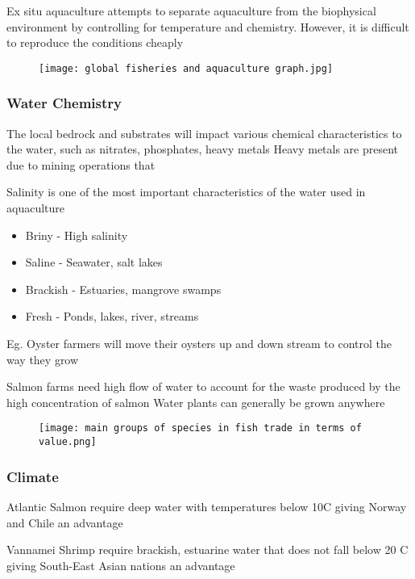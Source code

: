 		Ex situ aquaculture attempts to separate aquaculture from the biophysical environment by controlling for temperature and chemistry. However, it is difficult to reproduce the conditions cheaply

		\begin{figure}[H]
			\centering
			\texttt{[image: global fisheries and aquaculture graph.jpg]}
		\end{figure}

		\subsubsection{Water Chemistry}
			The local bedrock and substrates will impact various chemical characteristics to the water, such as nitrates, phosphates, heavy metals
			Heavy metals are present due to mining operations that 

			Salinity is one of the most important characteristics of the water used in aquaculture
			\begin{itemize}
				\item Briny - High salinity
				\item Saline - Seawater, salt lakes
				\item Brackish - Estuaries, mangrove swamps
				\item Fresh - Ponds, lakes, river, streams
			\end{itemize}
		
			Eg. Oyster farmers will move their oysters up and down stream to control the way they grow

			Salmon farms need high flow of water to account for the waste produced by the high concentration of salmon
			Water plants can generally be grown anywhere

			\begin{figure}[H]
				\centering
				\texttt{[image: main groups of species in fish trade in terms of value.png]}
			\end{figure}
			
		\subsubsection{Climate}
			Atlantic Salmon require deep water with temperatures below 10\textdegree C giving Norway and Chile an advantage

			Vannamei Shrimp require brackish, estuarine water that does not fall below 20 \textdegree C giving South-East Asian nations an advantage

